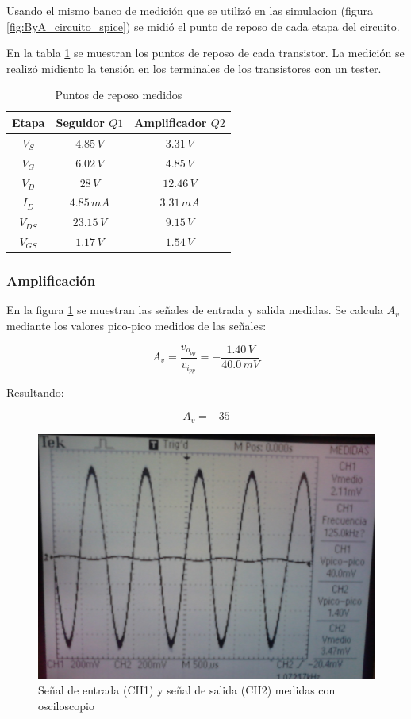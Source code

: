 \documentclass[10pt,spanish,a4paper,notitlepage]{article}
\begin{document}
Usando el mismo banco de medición que se utilizó en las simulacion (figura \ref{fig:ByA_circuito_spice})
se midió el punto de reposo de cada etapa del circuito.

En la tabla \ref{table:B_medicion_Q} se muestran los puntos de reposo de cada
transistor. La medición se realizó midiento la tensión en los terminales de los
transistores con un tester.

\begin{table}[H]
\centering
\begin{tabular}{|c|c|c|} 
\hline
Etapa & Seguidor $Q1$  & Amplificador $Q2$ \\ \hline
$V_{S}$ & $4.85\,\unit{V}$  & $3.31\,\unit{V}$ \\ \hline
$V_{G}$ & $6.02\,\unit{V}$  & $4.85\,\unit{V}$ \\ \hline
$V_{D}$ & $28\,\unit{V}$  & $12.46\,\unit{V}$ \\ \hline
$I_{D}$ & $4.85\,\unit{mA}$ & $3.31\,\unit{mA}$ \\ \hline
$V_{DS}$ & $23.15\,\unit{V}$ & $9.15\,\unit{V}$ \\ \hline
$V_{GS}$ & $1.17\,\unit{V}$  & $1.54\,\unit{V}$ \\ \hline
\end{tabular}
\caption{Puntos de reposo medidos}
\label{table:B_medicion_Q}
\end{table}

\subsubsection{Amplificación}

En la figura \ref{fig:B_medicion_Av} se muestran las señales de entrada y salida
medidas.
Se calcula $A_v$ mediante los valores pico-pico medidos de las señales:

\[ \displaystyle A_v = \frac{v_{o_{pp}}}{v_{i_{pp}}} = -\frac{1.40\,\unit{V}}{40.0\,\unit{mV}} \]

Resultando:

\[ \displaystyle A_v = -35 \]

\begin{figure}[H]
\centering
\includegraphics[scale=0.12]{mediciones/3_acoplado_Av.jpg}
\caption{Señal de entrada (CH1) y señal de salida (CH2) medidas con osciloscopio}
\label{fig:B_medicion_Av}
\end{figure}
\end{document}
